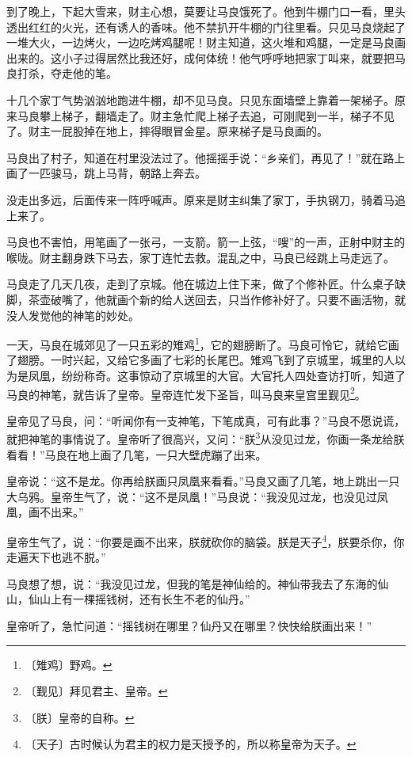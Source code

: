 \documentclass[12pt,UTF-8,openany]{ctexbook}
\begin{document}
\begin{Large}
    到了晚上，下起大雪来，财主心想，莫要让马良饿死了。他到牛棚门口一看，里头透出红红的火光，还有诱人的香味。他不禁扒开牛棚的门往里看。只见马良烧起了一堆大火，一边烤火，一边吃烤鸡腿呢！财主知道，这火堆和鸡腿，一定是马良画出来的。这小子过得居然比我还好，成何体统！他气呼呼地把家丁叫来，就要把马良打杀，夺走他的笔。
    
    十几个家丁气势汹汹地跑进牛棚，却不见马良。只见东面墙壁上靠着一架梯子。原来马良攀上梯子，翻墙走了。财主急忙爬上梯子去追，可刚爬到一半，梯子不见了。财主一屁股掉在地上，摔得眼冒金星。原来梯子是马良画的。
    
    马良出了村子，知道在村里没法过了。他摇摇手说：“乡亲们，再见了！”就在路上画了一匹骏马，跳上马背，朝路上奔去。
    
    没走出多远，后面传来一阵呼喊声。原来是财主纠集了家丁，手执钢刀，骑着马追上来了。
    
    马良也不害怕，用笔画了一张弓，一支箭。箭一上弦，“嗖”的一声，正射中财主的喉咙。财主翻身跌下马去，家丁连忙去救。混乱之中，马良已经跳上马走远了。
    
    马良走了几天几夜，走到了京城。他在城边上住下来，做了个修补匠。什么桌子缺脚，茶壶破嘴了，他就画个新的给人送回去，只当作修补好了。只要不画活物，就没人发觉他的神笔的妙处。
    
    一天，马良在城郊见了一只五彩的雉鸡\footnote{〔雉鸡〕野鸡。}，它的翅膀断了。马良可怜它，就给它画了翅膀。一时兴起，又给它多画了七彩的长尾巴。雉鸡飞到了京城里，城里的人以为是凤凰，纷纷称奇。这事惊动了京城里的大官。大官托人四处查访打听，知道了马良的神笔，就告诉了皇帝。皇帝连忙发下圣旨，叫马良来皇宫里觐见\footnote{〔觐见〕拜见君主、皇帝。}。
    
    皇帝见了马良，问：“听闻你有一支神笔，下笔成真，可有此事？”马良不愿说谎，就把神笔的事情说了。皇帝听了很高兴，又问：“朕\footnote{〔朕〕皇帝的自称。}从没见过龙，你画一条龙给朕看看！”马良在地上画了几笔，一只大壁虎蹦了出来。
    
    皇帝说：“这不是龙。你再给朕画只凤凰来看看。”马良又画了几笔，地上跳出一只大乌鸦。皇帝生气了，说：“这不是凤凰！”马良说：“我没见过龙，也没见过凤凰，画不出来。”
    
    皇帝生气了，说：“你要是画不出来，朕就砍你的脑袋。朕是天子\footnote{〔天子〕古时候认为君主的权力是天授予的，所以称皇帝为天子。}，朕要杀你，你走遍天下也逃不脱。”
    
    马良想了想，说：“我没见过龙，但我的笔是神仙给的。神仙带我去了东海的仙山，仙山上有一棵摇钱树，还有长生不老的仙丹。”
    
    皇帝听了，急忙问道：“摇钱树在哪里？仙丹又在哪里？快快给朕画出来！”
    

\end{Large}
\end{document}
